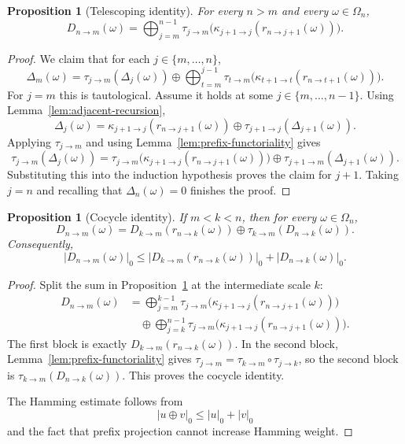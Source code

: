 \documentclass[11pt,reqno]{amsart}
\numberwithin{equation}{section}
\theoremstyle{plain}
\newtheorem{proposition}[theorem]{Proposition}
\theoremstyle{definition}
\theoremstyle{remark}
\begin{document}
\begin{proposition}[Telescoping identity]
\label{thm:telescoping}
For every $n>m$ and every $\omega\in\Omega_n$,
\[
D_{n\to m}(\omega)
=
\bigoplus_{j=m}^{n-1}
\tau_{j\to m}\bigl(\kappa_{j+1\to j}(r_{n\to j+1}(\omega))\bigr).
\]
\end{proposition}

\begin{proof}
We claim that for each $j\in\{m,\dots,n\}$,
\[
\Delta_m(\omega)
=
\tau_{j\to m}(\Delta_j(\omega))
\oplus
\bigoplus_{t=m}^{j-1}
\tau_{t\to m}\bigl(\kappa_{t+1\to t}(r_{n\to t+1}(\omega))\bigr).
\]
For $j=m$ this is tautological.  Assume it holds at some
$j\in\{m,\dots,n-1\}$.  Using Lemma~\ref{lem:adjacent-recursion},
\[
\Delta_j(\omega)
=
\kappa_{j+1\to j}(r_{n\to j+1}(\omega))
\oplus
\tau_{j+1\to j}(\Delta_{j+1}(\omega)).
\]
Applying $\tau_{j\to m}$ and using Lemma~\ref{lem:prefix-functoriality} gives
\[
\tau_{j\to m}(\Delta_j(\omega))
=
\tau_{j\to m}\bigl(\kappa_{j+1\to j}(r_{n\to j+1}(\omega))\bigr)
\oplus
\tau_{j+1\to m}(\Delta_{j+1}(\omega)).
\]
Substituting this into the induction hypothesis proves the claim for $j+1$.
Taking $j=n$ and recalling that $\Delta_n(\omega)=0$ finishes the proof.
\end{proof}

\begin{proposition}[Cocycle identity]
\label{prop:cocycle}
If $m<k<n$, then for every $\omega\in\Omega_n$,
\[
D_{n\to m}(\omega)
=
D_{k\to m}(r_{n\to k}(\omega))
\oplus
\tau_{k\to m}(D_{n\to k}(\omega)).
\]
Consequently,
\[
\lvert D_{n\to m}(\omega)\rvert_0
\le
\lvert D_{k\to m}(r_{n\to k}(\omega))\rvert_0
+
\lvert D_{n\to k}(\omega)\rvert_0.
\]
\end{proposition}

\begin{proof}
Split the sum in Proposition~\ref{thm:telescoping} at the intermediate scale $k$:
\[
\begin{aligned}
D_{n\to m}(\omega)
&=
\bigoplus_{j=m}^{k-1}
\tau_{j\to m}\bigl(\kappa_{j+1\to j}(r_{n\to j+1}(\omega))\bigr) \\
&\quad\oplus
\bigoplus_{j=k}^{n-1}
\tau_{j\to m}\bigl(\kappa_{j+1\to j}(r_{n\to j+1}(\omega))\bigr).
\end{aligned}
\]
The first block is exactly $D_{k\to m}(r_{n\to k}(\omega))$.  In the second
block, Lemma~\ref{lem:prefix-functoriality} gives
$\tau_{j\to m}=\tau_{k\to m}\circ\tau_{j\to k}$, so the second block is
$\tau_{k\to m}(D_{n\to k}(\omega))$.  This proves the cocycle identity.

The Hamming estimate follows from
\[
\lvert u\oplus v\rvert_0\le \lvert u\rvert_0+\lvert v\rvert_0
\]
and the fact that prefix projection cannot increase Hamming weight.
\end{proof}
\end{document}
